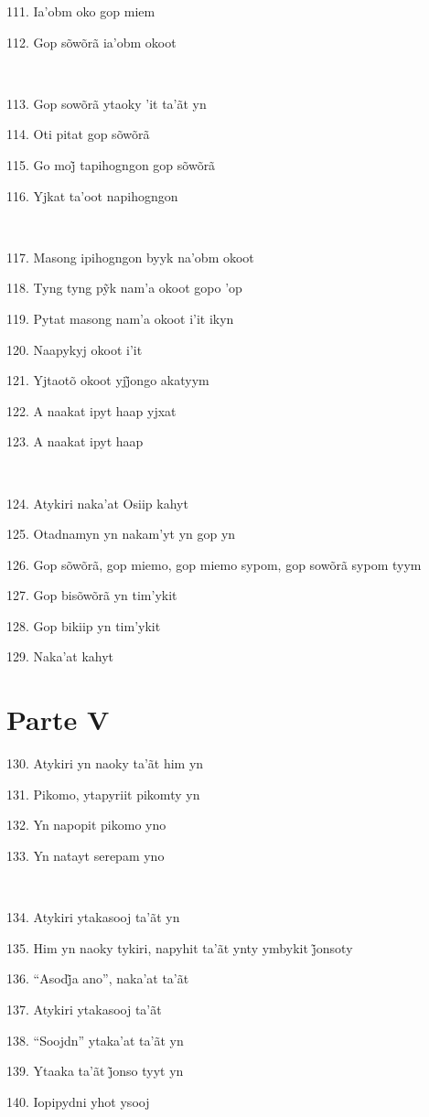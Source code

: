 111. Ia'obm oko gop miem

112. Gop sõwõrã ia'obm okoot

~

113. Gop sowõrã ytaoky 'it ta'ãt yn

114. Oti pitat gop sõwõrã

115. Go moj̃ tapihogngon gop sõwõrã

116. Yjkat ta'oot napihogngon

~

117. Masong ipihogngon byyk na'obm okoot

118. Tyng tyng pỹk nam’a okoot gopo ’op

119. Pytat masong nam'a okoot i'it ikyn

120. Naapykyj okoot i'it

121. Yjtaotõ okoot yjj̃ongo akatyym

122. A naakat ipyt haap yjxat

123. A naakat ipyt haap

~

124. Atykiri naka'at Osiip kahyt

125. Otadnamyn yn nakam'yt yn gop yn

126. Gop sõwõrã, gop miemo, gop miemo sypom, gop sowõrã sypom tyym

127. Gop bisõwõrã yn tim'ykit

128. Gop bikiip yn tim'ykit

129. Naka'at kahyt

\section{Parte V}

130. Atykiri yn naoky ta'ãt him yn

131. Pikomo, ytapyriit pikomty yn

132. Yn napopit pikomo yno

133. Yn natayt serepam yno

~

134. Atykiri ytakasooj ta'ãt yn

135. Him yn naoky tykiri, napyhit ta’ãt ynty ymbykit j̃onsoty

136. ``Asodj̃a ano'', naka’at ta’ãt

137. Atykiri ytakasooj ta'ãt

138. ``Soojdn'' ytaka'at ta'ãt yn

139. Ytaaka ta’ãt j̃onso tyyt yn

140. Iopipydni yhot ysooj

